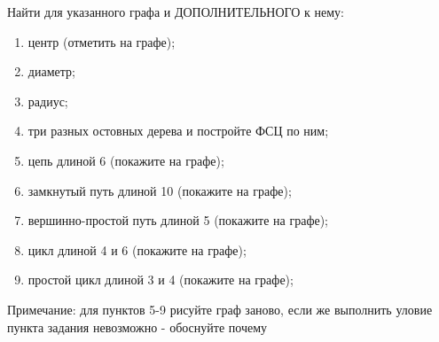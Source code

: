 \question
Найти для указанного графа и ДОПОЛНИТЕЛЬНОГО к нему:
\begin{enumerate}
\item  центр (отметить на графе);
\item  диаметр;
\item  радиус;
\item  три разных остовных дерева и постройте ФСЦ по ним;
\item  цепь длиной 6 (покажите на графе);
\item  замкнутый путь длиной 10 (покажите на графе);
\item  вершинно-простой путь длиной 5 (покажите на графе);
\item  цикл длиной 4 и 6 (покажите на графе);
\item  простой цикл длиной 3 и 4 (покажите на графе);
\end{enumerate}
Примечание: для пунктов 5-9 рисуйте граф заново, если же выполнить уловие пункта задания невозможно  - обоснуйте почему
\begin{figure}[h]

\begin{minipage}[h]{0.55\linewidth}
\end{minipage}
\begin{minipage}[h]{0.45\linewidth}
\end{minipage}
\end{figure}
